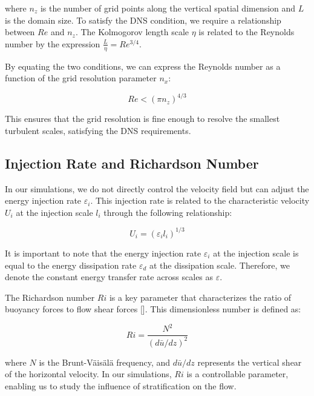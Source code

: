 \documentclass[final,5p,times,twocolumn,authoryear]{elsarticle}
\begin{document}
where $n_z$ is the number of grid points along the vertical spatial dimension and $L$ is the domain size. To satisfy the DNS condition, we require a relationship between $Re$ and $n_z$. The Kolmogorov length scale $\eta$ is related to the Reynolds number by the expression $\frac{L}{\eta} = Re^{3/4}$.

By equating the two conditions, we can express the Reynolds number as a function of the grid resolution parameter $n_x$:

\begin{equation}
Re < \left( \pi n_z \right)^{4/3}
\end{equation}

This ensures that the grid resolution is fine enough to resolve the smallest turbulent scales, satisfying the DNS requirements.

\subsection{Injection Rate and Richardson Number}

In our simulations, we do not directly control the velocity field but can adjust the energy injection rate $\varepsilon_i$. This injection rate is related to the characteristic velocity $U_i$ at the injection scale $l_i$ through the following relationship:

\begin{equation*}
U_i = (\varepsilon_i l_i)^{1/3}
\end{equation*}

It is important to note that the energy injection rate $\varepsilon_i$ at the injection scale is equal to the energy dissipation rate $\varepsilon_d$ at the dissipation scale. Therefore, we denote the constant energy transfer rate across scales as $\varepsilon$.

The Richardson number $Ri$ is a key parameter that characterizes the ratio of buoyancy forces to flow shear forces [\cite{cushman-roisin_introduction_2011}]. This dimensionless number is defined as:

\begin{equation}
Ri = \frac{N^2}{\left(d \bar{u} / dz \right)^2}
\end{equation}

where $N$ is the Brunt-Väisälä frequency, and $d\bar{u}/dz$ represents the vertical shear of the horizontal velocity. In our simulations, $Ri$ is a controllable parameter, enabling us to study the influence of stratification on the flow.
\end{document}
